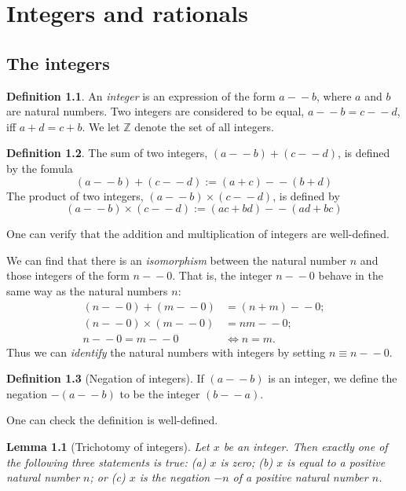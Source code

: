 \documentclass[
]{book}
\newtheorem{lemma}{Lemma}[chapter]
\theoremstyle{definition}
\newtheorem{definition}{Definition}[chapter]
\theoremstyle{definition}
\theoremstyle{definition}
\theoremstyle{definition}
\theoremstyle{remark}
\begin{document}
\chapter{Integers and rationals}\label{integers}

\section{The integers}\label{the-integers}

\begin{definition}
An \emph{integer} is an expression of the form \(a\!\!-\!\!-b\), where \(a\) and \(b\) are natural numbers. Two integers are considered to be equal, \(a\!\!-\!\!-b = c\!\!-\!\!-d\), iff \(a+d = c+b\). We let \(\mathbb{Z}\) denote the set of all integers.
\end{definition}

\begin{definition}
The sum of two integers, \((a\!\!-\!\!-b) + (c\!\!-\!\!-d)\), is defined by the fomula
\[
(a\!\!-\!\!-b) + (c\!\!-\!\!-d):=(a+c)\!\!-\!\!-(b+d)
\]
The product of two integers, \((a\!\!-\!\!-b) \times (c\!\!-\!\!-d)\), is defined by
\[
(a\!\!-\!\!-b) \times (c\!\!-\!\!-d):=(ac+bd)\!\!-\!\!-(ad+bc)
\]
\end{definition}

One can verify that the addition and multiplication of integers are well-defined.

We can find that there is an \emph{isomorphism} between the natural number \(n\) and those integers of the form \(n\!\!-\!\!-0\). That is, the integer \(n\!\!-\!\!-0\) behave in the same way as the natural numbers \(n\):
\[
\begin{aligned}
(n\!\!-\!\!-0)+(m\!\!-\!\!-0)&=(n+m)\!\!-\!\!-0;\\
(n\!\!-\!\!-0)\times(m\!\!-\!\!-0)&=nm\!\!-\!\!-0;\\
n\!\!-\!\!-0=m\!\!-\!\!-0& \iff n=m.
\end{aligned}
\]
Thus we can \emph{identify} the natural numbers with integers by setting \(n \equiv n\!\!-\!\!-0\).

\begin{definition}[Negation of integers]
If \((a\!\!-\!\!-b)\) is an integer, we define the negation \(-(a\!\!-\!\!-b)\) to be the integer \((b\!\!-\!\!-a)\).
\end{definition}

One can check the definition is well-defined.

\begin{lemma}[Trichotomy of integers]
Let \(x\) be an integer. Then exactly one of the following three statements is true: (a) \(x\) is zero; (b) \(x\) is equal to a positive natural number \(n\); or (c) \(x\) is the negation \(-n\) of a positive natural number \(n\).
\end{lemma}
\end{document}
